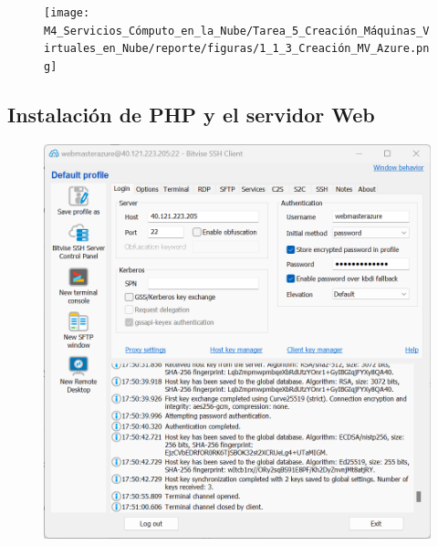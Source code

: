 \documentclass[12pt,a4paper]{article}
\begin{document}
\begin{figure}[H]
    \centering
    \texttt{[image: M4\_Servicios\_Cómputo\_en\_la\_Nube/Tarea\_5\_Creación\_Máquinas\_Virtuales\_en\_Nube/reporte/figuras/1\_1\_3\_Creación\_MV\_Azure.png]}
    \label{fig:Azure_3}
\end{figure}

\subsection{Instalación de PHP y el servidor Web}

\begin{figure}[H]
    \centering
    \includegraphics[width=1\linewidth]{M4_Servicios_Cómputo_en_la_Nube/Tarea_5_Creación_Máquinas_Virtuales_en_Nube/reporte/figuras/1_2_1_PHP_servidor_Web.png}
    \label{fig:Azure_4}
\end{figure}
\end{document}
